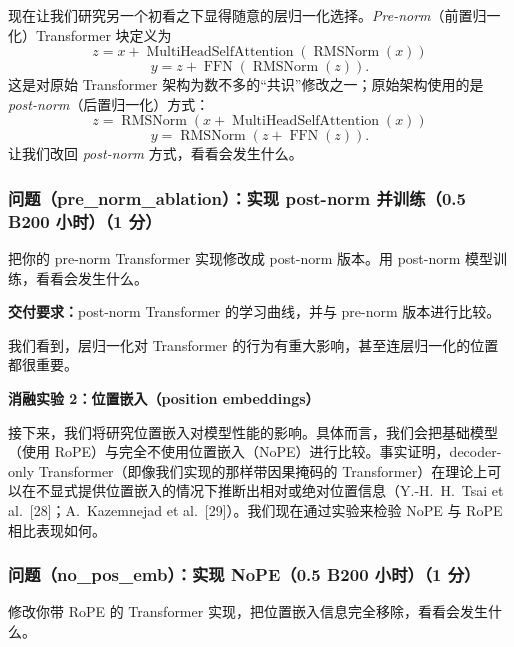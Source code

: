 现在让我们研究另一个初看之下显得随意的层归一化选择。\textit{Pre-norm}（前置归一化）Transformer 块定义为
\begin{equation}
z = x + \operatorname{MultiHeadSelfAttention}(\operatorname{RMSNorm}(x))
\tag{25}
\end{equation}
\begin{equation}
y = z + \operatorname{FFN}(\operatorname{RMSNorm}(z)).
\tag{26}
\end{equation}
这是对原始 Transformer 架构为数不多的``共识''修改之一；原始架构使用的是 \textit{post-norm}（后置归一化）方式：
\begin{equation}
z = \operatorname{RMSNorm}(x + \operatorname{MultiHeadSelfAttention}(x))
\tag{27}
\end{equation}
\begin{equation}
y = \operatorname{RMSNorm}(z + \operatorname{FFN}(z)).
\tag{28}
\end{equation}
让我们改回 \textit{post-norm} 方式，看看会发生什么。

\subsubsection*{问题（pre\_norm\_ablation）：实现 post-norm 并训练（0.5 B200 小时）（1 分）}

把你的 pre-norm Transformer 实现修改成 post-norm 版本。用 post-norm 模型训练，看看会发生什么。

\textbf{交付要求：}post-norm Transformer 的学习曲线，并与 pre-norm 版本进行比较。

我们看到，层归一化对 Transformer 的行为有重大影响，甚至连层归一化的位置都很重要。

\textbf{消融实验 2：位置嵌入（position embeddings）}

接下来，我们将研究位置嵌入对模型性能的影响。具体而言，我们会把基础模型（使用 RoPE）与完全不使用位置嵌入（NoPE）进行比较。事实证明，decoder-only Transformer（即像我们实现的那样带因果掩码的 Transformer）在理论上可以在不显式提供位置嵌入的情况下推断出相对或绝对位置信息（Y.-H.~H.~Tsai et al.~[28]；A.~Kazemnejad et al.~[29]）。我们现在通过实验来检验 NoPE 与 RoPE 相比表现如何。

\subsubsection*{问题（no\_pos\_emb）：实现 NoPE（0.5 B200 小时）（1 分）}

修改你带 RoPE 的 Transformer 实现，把位置嵌入信息完全移除，看看会发生什么。

